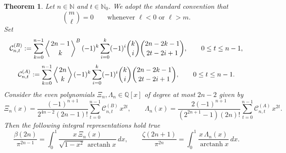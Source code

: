 \documentclass[11pt,twoside]{article}
\newtheorem{theorem}{Theorem}[section]
\numberwithin{equation}{section}
\begin{document}
\begin{theorem}\label{theorem:explicit_polynomials}
Let $n\in\mathbb N$ and $t\in\mathbb N_0$. We adopt the standard convention that
\[
\binom{m}{\ell}=0 \qquad\text{whenever }\ell<0\text{ or }\ell>m.
\]
Set
\[
\mathcal C^{(B)}_{n,t}
:=
\sum_{k=0}^{n-1}\left\langle {2n-1 \atop k}\right\rangle^{B}(-1)^{k}
\sum_{i=0}^{k}(-1)^i\binom{k}{i}\binom{2n-2k-1}{2t-2i+1},
\qquad 0\le t\le n-1,
\]
\[
\mathcal C^{(A)}_{n,t}
:=
\sum_{k=0}^{n-1}\left\langle {2n \atop k}\right\rangle(-1)^{k}
\sum_{i=0}^{k}(-1)^i\binom{k}{i}\binom{2n-2k-1}{2t-2i+1},
\qquad 0\le t\le n-1.
\]
Consider the even polynomials $\Xi_n,\Lambda_n\in\mathbb Q[x]$ of degree at most $2n-2$ given by
\begin{equation}\label{eq:XiLambda-explicit}
\Xi_n(x)=\frac{(-1)^{n+1}}{2^{4n-2}(2n-1)!}\sum_{t=0}^{n-1}\mathcal C^{(B)}_{n,t}\,x^{2t},
\qquad
\Lambda_n(x)=\frac{2(-1)^{n+1}}{(2^{2n+1}-1)(2n)!}\sum_{t=0}^{n-1}\mathcal C^{(A)}_{n,t}\,x^{2t}.
\end{equation}
Then the following integral representations hold true
\begin{equation}\label{eq:beta-zeta-reps}
\frac{\beta(2n)}{\pi^{2n-1}}
=
\int_0^1 \frac{x\,\Xi_n(x)}{\sqrt{1-x^2}\,\operatorname{arctanh}x}\,dx,
\qquad
\frac{\zeta(2n+1)}{\pi^{2n}}
=
\int_0^1 \frac{x\,\Lambda_n(x)}{\operatorname{arctanh}x}\,dx.
\end{equation}
\end{theorem}
\end{document}
